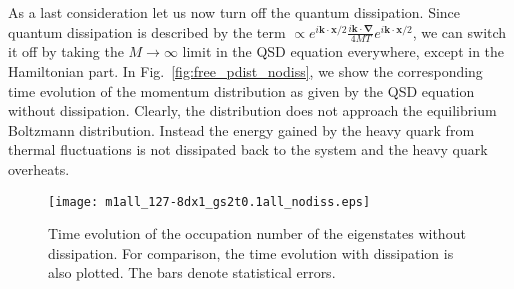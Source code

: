 \documentclass[prd,11pt, amsmath, amsymb, aps, reprint, tightenlines, nofootinbib, longbibliography, abbrv, preprintnumbers]{revtex4-1}
\begin{document}
As a last consideration let us now turn off the quantum dissipation.
Since quantum dissipation is described by the term $\propto e^{i\bm k \cdot\bm x/2}\frac{i\bm k\cdot\bm\nabla}{4MT}e^{i\bm k \cdot\bm x/2}$, we can switch it off by taking the $M\to \infty$ limit in the QSD equation everywhere, except in the Hamiltonian part.
In Fig.~\ref{fig:free_pdist_nodiss}, we show the corresponding time evolution of the momentum distribution as given by the QSD equation without dissipation.
Clearly, the distribution does not approach the equilibrium Boltzmann distribution.
Instead the energy gained by the heavy quark from thermal fluctuations is not dissipated back to the system and the heavy quark overheats.

\begin{figure}
\centering
\texttt{[image: m1all\_127-8dx1\_gs2t0.1all\_nodiss.eps]}
\caption{
Time evolution of the occupation number of the eigenstates without dissipation.
For comparison, the time evolution with dissipation is also plotted.
The bars denote statistical errors.
}
\label{fig:potential_evolution_nodiss}
\end{figure}
\end{document}
